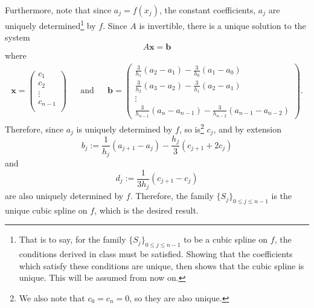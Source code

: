 \documentclass[12pt]{article}
\begin{document}
\begin{enumerate}[leftmargin=2em]
\begin{enumerate}
        Furthermore, note that since $a_j=f(x_{j})$, the constant coefficients, $a_j$ are uniquely determined\footnote{That is to say, for the family $\{S_j\}_{0\leq j \leq n-1}$ to be a cubic spline on $f$, the conditions derived in class must be satisfied. Showing that the coefficients which satisfy these conditions are unique, then shows that the cubic spline is unique. This will be assumed from now on.} by $f$. Since $A$ is invertible, there is a unique solution to the system
        \[A\mathbf{x}=\mathbf{b}\]
        where
        \begin{align*}
            \mathbf{x} = \begin{pmatrix}
                c_1 \\ 
                c_2 \\ 
                \vdots \\
                c_{n-1}\\
            \end{pmatrix} & & \text{and} && \mathbf{b}=
            \begin{pmatrix}
                \frac{3}{h_{1}}(a_{2}-a_{1}) - \frac{3}{h_{0}}(a_{1}-a_{0})\\
                \frac{3}{h_{2}}(a_{3}-a_{2}) - \frac{3}{h_{1}}(a_{2}-a_{1})\\ 
                \vdots\\
                \frac{3}{h_{n-1}}(a_{n}-a_{n-1})- \frac{3}{h_{n-2}}(a_{n-1}-a_{n-2})
            \end{pmatrix}.
        \end{align*}
        Therefore, since $a_j$ is uniquely determined by $f$, so is\footnote{We also note that $c_0=c_n=0$, so they are also unique.} $c_j$, and by extension 
        \[b_j:= \frac{1}{h_{j}}(a_{j+1}-a_{j})-\frac{h_{j}}{3}(c_{j+1}+2c_{j})\]
        and 
        \[d_j:=\frac{1}{3h_{j}}(c_{j+1}-c_{j})\]
        are also uniquely determined by $f$. Therefore, the family $\{S_{j}\}_{0\leq j\leq n-1}$ is the unique cubic spline on $f$, which is the desired result.
    \end{enumerate}
\end{enumerate}
\end{document}
